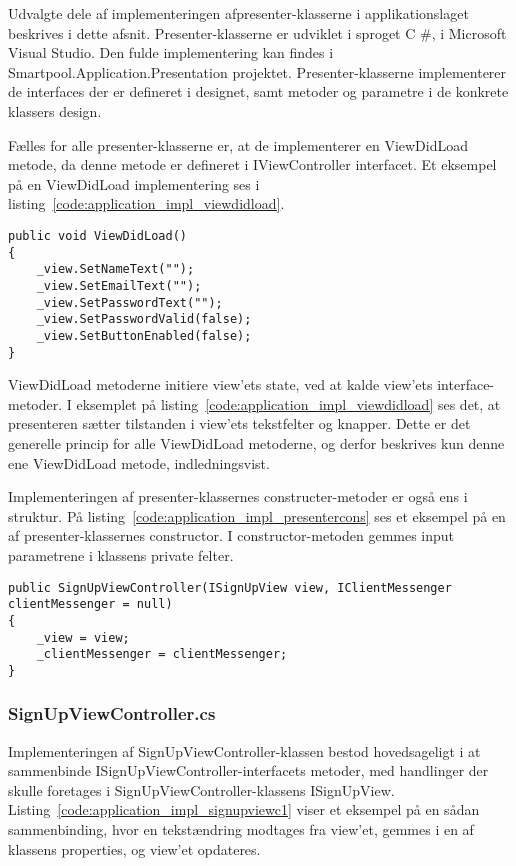 Udvalgte dele af implementeringen afpresenter-klasserne i applikationslaget beskrives i dette afsnit. Presenter-klasserne er udviklet i sproget C \#, i Microsoft Visual Studio. Den fulde implementering kan findes i Smartpool.Application.Presentation projektet. Presenter-klasserne implementerer de interfaces der er defineret i designet, samt metoder og parametre i de konkrete klassers design.

Fælles for alle presenter-klasserne er, at de implementerer en ViewDidLoad metode, da denne metode er defineret i IViewController interfacet. Et eksempel på en ViewDidLoad implementering ses i listing~\ref{code:application_impl_viewdidload}.

\begin{lstlisting}[caption={ViewDidLoad() i SignUpViewController.cs},label={code:application_impl_viewdidload}]
public void ViewDidLoad()
{
	_view.SetNameText("");
	_view.SetEmailText("");
	_view.SetPasswordText("");
	_view.SetPasswordValid(false);
	_view.SetButtonEnabled(false);
}
\end{lstlisting}

ViewDidLoad metoderne initiere view'ets state, ved at kalde view'ets interface-metoder. I eksemplet på listing~\ref{code:application_impl_viewdidload} ses det, at presenteren sætter tilstanden i view'ets tekstfelter og knapper. Dette er det generelle princip for alle ViewDidLoad metoderne, og derfor beskrives kun denne ene ViewDidLoad metode, indledningsvist.

Implementeringen af presenter-klassernes constructer-metoder er også ens i struktur. På listing~\ref{code:application_impl_presentercons} ses et eksempel på en af presenter-klassernes constructor. I constructor-metoden gemmes input parametrene i klassens private felter.

\begin{lstlisting}[caption={Constructor i SignUpViewController.cs},label={code:application_impl_presentercons}]
public SignUpViewController(ISignUpView view, IClientMessenger clientMessenger = null)
{
	_view = view;
	_clientMessenger = clientMessenger;
}
\end{lstlisting}

\subsubsection{SignUpViewController.cs}
Implementeringen af SignUpViewController-klassen bestod hovedsageligt i at sammenbinde ISignUpViewController-interfacets metoder, med handlinger der skulle foretages i SignUpViewController-klassens ISignUpView. Listing~\ref{code:application_impl_signupviewc1} viser et eksempel på en sådan sammenbinding, hvor en tekstændring modtages fra view'et, gemmes i en af klassens properties, og view'et opdateres.


